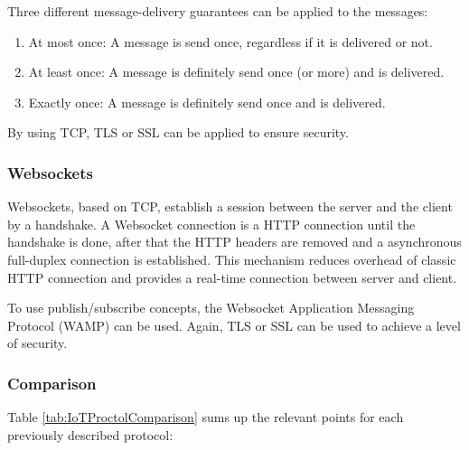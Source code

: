 Three different message-delivery guarantees can be applied to the messages:

\begin{enumerate}
	\item At most once: A message is send once, regardless if it is delivered or not.
	\item At least once: A message is definitely send once (or more) and is delivered.
	\item Exactly once: A message is definitely send once and is delivered.
\end{enumerate}

By using TCP, TLS or SSL can be applied to ensure security.

\subsubsection{Websockets}
Websockets, based on TCP, establish a session between the server and the client by a handshake. A Websocket connection is a HTTP connection until the handshake is done, after that the HTTP headers are removed and a asynchronous full-duplex connection is established. This mechanism reduces overhead of classic HTTP connection and provides a real-time connection between server and client.

To use publish/subscribe concepts, the Websocket Application Messaging Protocol (WAMP) can be used. Again, TLS or SSL can be used to achieve a level of security.

\subsubsection{Comparison}

Table \ref{tab:IoTProctolComparison} sums up the relevant points for each previously described protocol\cite{iotprotocols}:

